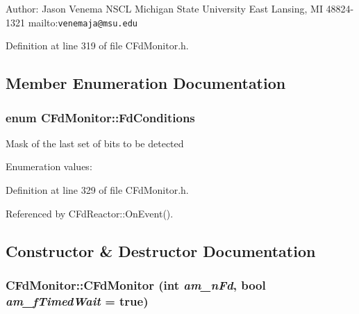 Author: Jason Venema NSCL Michigan State University East Lansing, MI 48824-1321 mailto:{\tt venemaja@msu.edu} 



Definition at line 319 of file CFd\-Monitor.h.

\subsection{Member Enumeration Documentation}
\subsubsection{\setlength{\rightskip}{0pt plus 5cm}enum CFd\-Monitor::Fd\-Conditions}\label{classCFdMonitor_s3}


Mask of the last set of bits to be detected \begin{Desc}
\item[Enumeration values:]\par
\begin{description}
\item[{\em 
{\em FD\_\-READABLE}\label{classCFdMonitor_s3s0}
}]\item[{\em 
{\em FD\_\-WRITABLE}\label{classCFdMonitor_s3s1}
}]\item[{\em 
{\em FD\_\-EXCEPTION}\label{classCFdMonitor_s3s2}
}]\end{description}
\end{Desc}



Definition at line 329 of file CFd\-Monitor.h.

Referenced by CFd\-Reactor::On\-Event().

\subsection{Constructor \& Destructor Documentation}
\subsubsection{\setlength{\rightskip}{0pt plus 5cm}CFd\-Monitor::CFd\-Monitor (int {\em am\_\-n\-Fd}, bool {\em am\_\-f\-Timed\-Wait} = true)\hspace{0.3cm}{\tt  [inline]}}\label{classCFdMonitor_a0}




